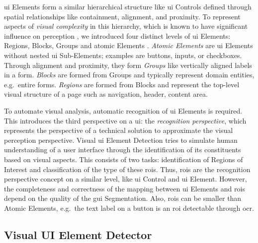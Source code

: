 \gls{ui} Elements form a similar hierarchical structure like \gls{ui} Controls defined through spatial relationships like containment, alignment, and proximity.
To represent aspects of \emph{visual complexity} \autocite{Bakaev2019JWE} in this hierarchy, which is known to have significant influence on perception \autocite{Tuch2009VisualComplexity}, we introduced four distinct levels of \gls{ui} Elements: Regions, Blocks, Groups and atomic Elements \autocite{Heil2016Similarity}.
\emph{Atomic Elements} \autocite{Bakaev2019JWE} are \gls{ui} Elements without nested \gls{ui} Sub-Elements; examples are buttons, inputs, or checkboxes.
Through alignment and proximity, they form \emph{Groups} like vertically aligned labels in a form.
\emph{Blocks} are formed from Groups and typically represent domain entities, e.g.~entire forms.
\emph{Regions} are formed from Blocks and represent the top-level visual structure of a page such as navigation, header, content area.

To automate visual analysis, automatic recognition of \gls{ui} Elements is required.
This introduces the third perspective on a \gls{ui}: the \emph{recognition perspective}, which represents the perspective of a technical solution to approximate the visual perception perspective.
Visual \gls{ui} Element Detection tries to simulate human understanding of a user interface through the identification of its constituents based on visual aspects.
This consists of two tasks: identification of Regions of Interest and classification of the type of these \glspl{roi}.
Thus, \glspl{roi} are the recognition perspective concept on a similar level, like \gls{ui} Control and \gls{ui} Element.
However, the completeness and correctness of the mapping between \gls{ui} Elements and \glspl{roi} depend on the quality of the \gls{gui} Segmentation.
Also, \glspl{roi} can be smaller than Atomic Elements, e.g.~the text label on a button is an \gls{roi} detectable through \gls{ocr}.

\vspace{-10pt}
\hypertarget{sec:segmentation.impl}{%
\subsection{Visual UI Element Detector}\label{sec:segmentation.impl}}
\vspace{10pt}

